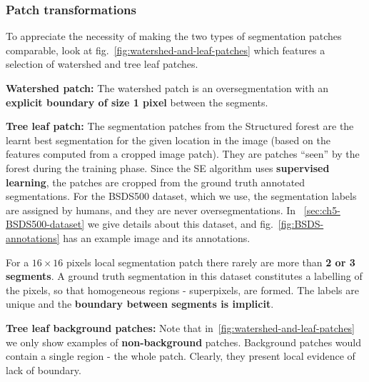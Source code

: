 \subsubsection{Patch transformations}
To appreciate the necessity of making the two types of segmentation patches comparable, look at fig.~\ref{fig:watershed-and-leaf-patches} which features a selection of watershed and tree leaf patches.

\textbf{Watershed patch:} The watershed patch is an oversegmentation with an \textbf{explicit boundary of size 1 pixel} between the segments.

\textbf{Tree leaf patch:} The segmentation patches from the Structured forest are the learnt best segmentation for the given location in the image (based on the features computed from a cropped image patch). They are patches ``seen'' by the forest during the training phase. Since the SE algorithm uses \textbf{supervised learning}, the patches are cropped from the ground truth annotated segmentations. 
For the BSDS500 dataset, which we use, the segmentation labels  are assigned by humans, and they are never oversegmentations. In \textsection~\ref{sec:ch5-BSDS500-dataset} we give details about this dataset, and fig.~\ref{fig:BSDS-annotations} has an example image and its annotations.

For a $16\times 16$ pixels local segmentation patch there rarely are more than \textbf{2 or 3 segments}. 
A ground truth segmentation in this dataset constitutes a labelling of the pixels, so that homogeneous regions - superpixels, are formed. The labels are unique and the \textbf{boundary between segments is implicit}.

\textbf{Tree leaf background patches:} Note that in~\ref{fig:watershed-and-leaf-patches} we only show examples of \textbf{non-background} patches. Background patches would contain a single region - the whole patch. Clearly, %
they present local evidence of lack of boundary.

